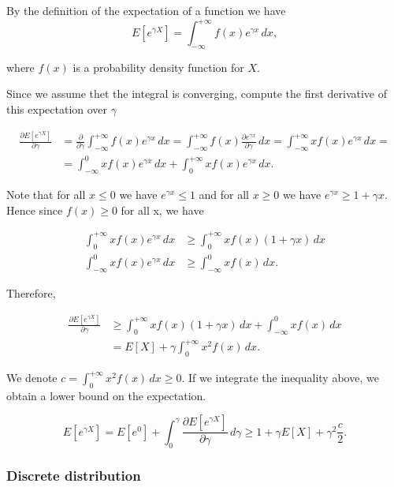 \documentclass[12pt, a4paper]{article}
\theoremstyle{remark}
\begin{document}
By the definition of the expectation of a function we have
\[
    E[e^{\gamma X}] = \int_{-\infty}^{+\infty} f(x) e^{\gamma x} \,dx,
\]

where $f(x)$ is a probability density function for $X$.

\hfill

Since we assume thet the integral is converging, compute the first derivative of this expectation over $\gamma$

\begin{align*}
    \frac{\partial E[e^{\gamma X}]}{\partial \gamma} & = \frac{\partial}{\partial \gamma} \int_{-\infty}^{+\infty} f(x) e^{\gamma x} \, dx = \int_{-\infty}^{+\infty} f(x) \frac{\partial e^{\gamma x}}{\partial \gamma} \, dx = \int_{-\infty}^{+\infty} x f(x) e^{\gamma x} \, dx = \\
    & = \int_{-\infty}^{0} x f(x) e^{\gamma x} \, dx + \int_{0}^{+\infty} x f(x) e^{\gamma x} \, dx.
\end{align*}

Note that for all $x \leq 0$ we have $e^{\gamma x} \leq 1$ and for all $x \geq 0$ we have $e^{\gamma x} \geq 1 + \gamma x$. Hence since $f(x) \geq 0$ for all x, we have

\begin{align*}
    \int_{0}^{+\infty} x f(x) e^{\gamma x} \, dx & \geq \int_{0}^{+\infty} x f(x) (1 + \gamma x)\, dx \\
    \int_{-\infty}^{0} x f(x) e^{\gamma x} \, dx & \geq \int_{-\infty}^{0} x f(x)\, dx.
\end{align*}

Therefore,

\begin{align*}
    \frac{\partial E[e^{\gamma X}]}{\partial \gamma} & \geq  \int_{0}^{+\infty} x f(x) (1 + \gamma x)\, dx + \int_{-\infty}^{0} x f(x)\, dx \\
    & = E[X] + \gamma \int_{0}^{+\infty} x^2 f(x) \, dx.
\end{align*}

We denote $c = \int_{0}^{+\infty} x^2 f(x) \, dx \geq 0$. If we integrate the inequality above, we obtain a lower bound on the expectation.

\[
    E[e^{\gamma X}] = E[e^{0}] + \int_0^\gamma \frac{\partial E[e^{\gamma X}]}{\partial \gamma} \, d\gamma \geq 1 + \gamma E[X] + \gamma^2 \frac{c}{2}.
\]

\subsubsection*{Discrete distribution}
\end{document}

